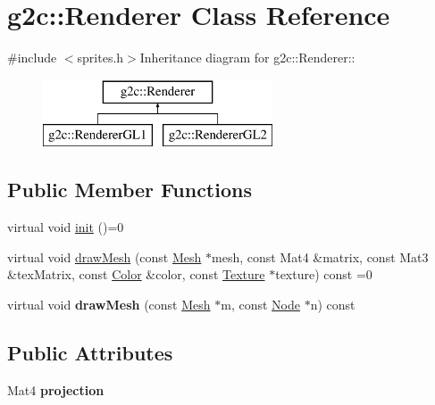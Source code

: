 \hypertarget{classg2c_1_1_renderer}{
\section{g2c::Renderer Class Reference}
\label{classg2c_1_1_renderer}
}


{\ttfamily \#include $<$sprites.h$>$}Inheritance diagram for g2c::Renderer::\begin{figure}[H]
\begin{center}
\leavevmode
\includegraphics[height=2cm]{classg2c_1_1_renderer}
\end{center}
\end{figure}
\subsection*{Public Member Functions}
\begin{DoxyCompactItemize}
\item 
virtual void \hyperlink{classg2c_1_1_renderer_adcfacb02cf062a77f0fb71ab30dbae76}{init} ()=0
\item 
virtual void \hyperlink{classg2c_1_1_renderer_a60445bc0c7ec75f1c7ee20066c25f8b3}{drawMesh} (const \hyperlink{classg2c_1_1_mesh}{Mesh} $\ast$mesh, const Mat4 \&matrix, const Mat3 \&texMatrix, const \hyperlink{classg2c_1_1_color}{Color} \&color, const \hyperlink{classg2c_1_1_texture}{Texture} $\ast$texture) const =0
\item 
\hypertarget{classg2c_1_1_renderer_abad3c83e4ff3b8f5ee28f1a26d773e1d}{
virtual void {\bfseries drawMesh} (const \hyperlink{classg2c_1_1_mesh}{Mesh} $\ast$m, const \hyperlink{classg2c_1_1_node}{Node} $\ast$n) const }
\label{classg2c_1_1_renderer_abad3c83e4ff3b8f5ee28f1a26d773e1d}

\end{DoxyCompactItemize}
\subsection*{Public Attributes}
\begin{DoxyCompactItemize}
\item 
\hypertarget{classg2c_1_1_renderer_aa0b929f6031e291d17c53c4565f40525}{
Mat4 {\bfseries projection}}
\label{classg2c_1_1_renderer_aa0b929f6031e291d17c53c4565f40525}

\end{DoxyCompactItemize}
